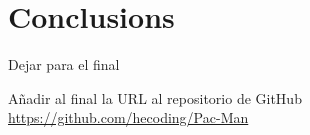 \documentclass{llncs}
\begin{document}
%
\section{Conclusions}
\label{sec:conclusions}
%


Dejar para el final

Añadir al final la URL al repositorio de GitHub
\url{https://github.com/hecoding/Pac-Man}



\end{document}
